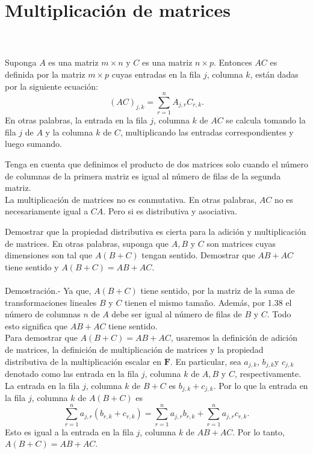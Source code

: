 \section{Multiplicación de matrices}

\begin{mydef}\,\\\\
    Suponga $A$ es una matriz $m\times n$ y $C$ es una matriz $n\times p$. Entonces $AC$ es definida por la matriz $m\times p$ cuyas entradas en la fila $j$, columna $k$, están dadas por la siguiente ecuación:
    $$(AC)_{j,k}=\sum_{r=1}^n A_{j,r}C_{r,k}.$$
    En otras palabras, la entrada en la fila $j$, columna $k$ de $AC$ se calcula tomando la fila $j$ de $A$ y la columna $k$ de $C$, multiplicando las entradas correspondientes y luego sumando.
\end{mydef}

Tenga en cuenta que definimos el producto de dos matrices solo cuando el número de columnas de la primera matriz es igual al número de filas de la segunda matriz.\\

La multiplicación de matrices no es conmutativa. En otras palabras, $AC$ no es necesariamente igual a $CA$. Pero si es distributiva y asociativa.

\begin{lema}
    Demostrar que la propiedad distributiva es cierta para la adición y multiplicación de matrices. En otras palabras, suponga que $A,B$ y $C$ son matrices cuyas dimensiones son tal que $A(B+C)$ tengan sentido. Demostrar que $AB+AC$ tiene sentido y $A(B+C)=AB+AC$.\\\\
	Demostración.-\; Ya que, $A(B+C)$ tiene sentido, por la matriz de la suma de transformaciones lineales $B$ y $C$ tienen el mismo tamaño. Además, por 1.38 el número de columnas $n$ de $A$ debe ser igual al número de filas de $B$ y $C$. Todo esto significa que $AB+AC$ tiene sentido.\\
	Para demostrar que $A(B+C)=AB+AC$, usaremos la definición de adición de matrices, la definición de multiplicación de matrices y la propiedad distributiva de la multiplicación escalar en $\textbf{F}$. En particular, sea $a_{j,k}$, $b_{j,k}$y $c_{j,k}$ denotado como las entrada en la fila $j$, columna $k$ de $A,B$ y $C$, respectivamente. La entrada en la fila $j$, columna $k$ de $B+C$ es $b_{j,k}+c_{j,k}$. Por lo que la entrada en la fila $j$, columna $k$ de $A(B+C)$ es 
	$$\sum_{r=1}^n a_{j,r}(b_{r,k}+c_{r,k})=\sum_{r=1}^n a_{j,r}b_{r,k}+\sum_{r=1}^n a_{j,r}c_{r,k}.$$
	Esto es igual a la entrada en la fila $j$, columna $k$ de $AB+AC$. Por lo tanto, $A(B+C)=AB+AC$.
\end{lema}

